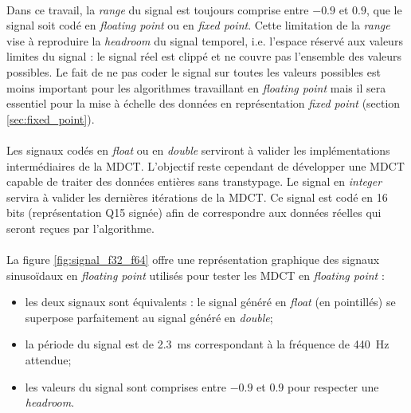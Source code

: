 \documentclass{article}
\begin{document}
    \paragraph{}
    Dans ce travail, la \emph{range} du signal est toujours comprise entre $-0.9$ et $0.9$, que le signal soit codé en \emph{floating point} ou en \emph{fixed point}. Cette limitation de la \emph{range} vise à reproduire la \emph{headroom} du signal temporel, i.e. l'espace réservé aux valeurs limites du signal : le signal réel est clippé et ne couvre pas l'ensemble des valeurs possibles. Le fait de ne pas coder le signal sur toutes les valeurs possibles est moins important pour les algorithmes travaillant en \emph{floating point} mais il sera essentiel pour la mise à échelle des données en représentation \emph{fixed point} (section \ref{sec:fixed_point}).

    \paragraph{}
    Les signaux codés en \emph{float} ou en \emph{double} serviront à valider les implémentations intermédiaires de la MDCT. L'objectif reste cependant de développer une MDCT capable de traiter des données entières sans transtypage. Le signal en \emph{integer} servira à valider les dernières itérations de la MDCT. Ce signal est codé en 16 bits (représentation Q15 signée) afin de correspondre aux données réelles qui seront reçues par l'algorithme.

    \paragraph{}
    La figure \ref{fig:signal_f32_f64} offre une représentation graphique des signaux sinusoïdaux en \emph{floating point} utilisés pour tester les MDCT en \emph{floating point} :
    \begin{itemize}
        \item les deux signaux sont équivalents : le signal généré en \emph{float} (en pointillés) se superpose parfaitement au signal généré en \emph{double};
        \item la période du signal est de \SI{2.3}{\milli\second} correspondant à la fréquence de \SI{440}{\hertz} attendue;
        \item les valeurs du signal sont comprises entre $-0.9$ et $0.9$ pour respecter une \emph{headroom}.
    \end{itemize}
\end{document}
